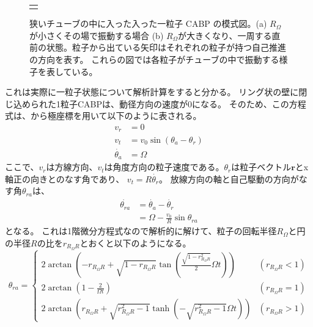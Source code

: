 \documentclass[/Users/ikedahajime/GitHub/reserch/master_report/thesis]{subfiles}
\begin{document}
\begin{figure}
\begin{tabular}{c}
\begin{minipage}{0.4\hsize}
        \end{minipage}
    \end{tabular}
    \caption[Four sample images]
    {
        狭いチューブの中に入った入った一粒子 CABP の模式図。(a) $R_{\Omega}$が小さくその場で振動する場合
        (b) $R_\Omega$が大きくなり、一周する直前の状態。粒子から出ている矢印はそれぞれの粒子が持つ自己推進の方向を表す。
        これらの図では各粒子がチューブの中で振動する様子を表している。
        }
        \label{fig:image_cabp_in_tube}
    \end{figure}

これは実際に一粒子状態について解析計算をすると分かる。
リング状の壁に閉じ込められた1粒子CABPは、動径方向の速度が0になる。
そのため、この方程式は、から極座標を用いて以下のように表される。
\begin{align}
    v_r&=0\\
    v_t&=v_0 \sin(\theta_a-\theta_r)\\
    \dot{\theta_a}&=\Omega
\end{align}
ここで、$v_r$は方線方向、$v_t$は角度方向の粒子速度である。$\theta_r$は粒子ベクトル$\bm{r}$とx軸正の向きとのなす角であり、
$v_t=R\dot{\theta_r}$。
放線方向の軸と自己駆動の方向がなす角$\theta_{ra}$は、
\begin{align}
    \dot{\theta_{ra}}&=\dot{\theta_a}-\dot{\theta_r}\\
    &=\Omega-\frac{v_0}{R}\sin \theta_{ra}
\end{align}
となる。
これは1階微分方程式なので解析的に解けて、粒子の回転半径$R_\Omega$と円の半径$R$の比を$r_{R_\Omega R}$とおくと以下のようになる。
\begin{equation}
    \theta_{ra}=
    \begin{cases}
        2 \arctan(-r_{R_\Omega R}+\sqrt{1-r_{R_\Omega R}}\tan (\frac{\sqrt{1-r_{R_\Omega R}^2}}{2}\Omega t))&(r_{R_\Omega R}<1)\\
        2 \arctan(1-\frac{2}{\Omega t}) &(r_{R_\Omega R}=1)\\
        2 \arctan(r_{R_\Omega R}+\sqrt{r_{R_\Omega R}^2-1}\tanh(-\sqrt{r_{R_\Omega R}^2-1}\Omega t))& (r_{R_\Omega R}>1)
    \end{cases}
\end{equation}
\end{document}
